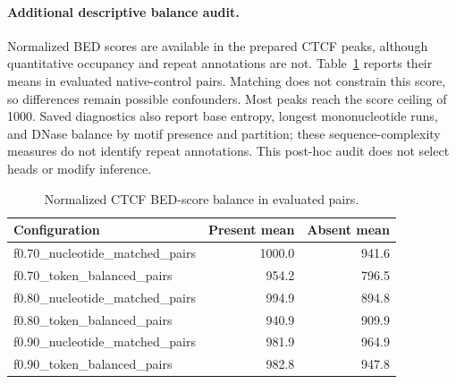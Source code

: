 \paragraph{Additional descriptive balance audit.}
Normalized BED scores are available in the prepared CTCF peaks, although quantitative occupancy and repeat annotations are not. Table~\ref{tab:bed-balance} reports their means in evaluated native-control pairs. Matching does not constrain this score, so differences remain possible confounders. Most peaks reach the score ceiling of 1000. Saved diagnostics also report base entropy, longest mononucleotide runs, and DNase balance by motif presence and partition; these sequence-complexity measures do not identify repeat annotations. This post-hoc audit does not select heads or modify inference.
\begin{table}[t]\centering\normalsize\caption{Normalized CTCF BED-score balance in evaluated pairs.}\label{tab:bed-balance}
\begin{tabular}{lrr}\toprule Configuration & Present mean & Absent mean \\\midrule
f0.70\_nucleotide\_matched\_pairs & 1000.0 & 941.6 \\
f0.70\_token\_balanced\_pairs & 954.2 & 796.5 \\
f0.80\_nucleotide\_matched\_pairs & 994.9 & 894.8 \\
f0.80\_token\_balanced\_pairs & 940.9 & 909.9 \\
f0.90\_nucleotide\_matched\_pairs & 981.9 & 964.9 \\
f0.90\_token\_balanced\_pairs & 982.8 & 947.8 \\
\bottomrule\end{tabular}
\end{table}
